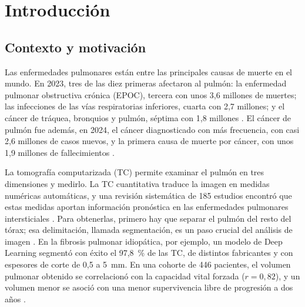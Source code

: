 %

\section{Introducción}\label{sec:introduction}

\subsection{Contexto y motivación}\label{sec:context}
Las enfermedades pulmonares están entre las principales causas de muerte en el
mundo. En 2023, tres de las diez primeras afectaron al pulmón: la enfermedad
pulmonar obstructiva crónica (EPOC), tercera con unos 3,6 millones de muertes;
las infecciones de las vías respiratorias inferiores, cuarta con 2,7 millones;
y el cáncer de tráquea, bronquios y pulmón, séptima con 1,8 millones
\parencite{oms2026}. El cáncer de pulmón fue además, en 2024, el cáncer
diagnosticado con más frecuencia, con casi 2,6 millones de casos nuevos, y la
primera causa de muerte por cáncer, con unos 1,9 millones de fallecimientos
\parencite{sung2026}.

La tomografía computarizada (TC) permite examinar el pulmón en tres
dimensiones y medirlo. La TC cuantitativa traduce la imagen en medidas
numéricas automáticas, y una revisión sistemática de 185 estudios encontró que
estas medidas aportan información pronóstica en las enfermedades pulmonares
intersticiales \parencite{dixon2025}. Para obtenerlas, primero hay que separar
el pulmón del resto del tórax; esa delimitación, llamada segmentación, es un
paso crucial del análisis de imagen \parencite{hofmanninger2020}. En la
fibrosis pulmonar idiopática, por ejemplo, un modelo de Deep Learning segmentó
con éxito el 97,8~\% de las TC, de distintos fabricantes y con espesores de
corte de 0,5 a 5~mm. En una cohorte de 446 pacientes, el volumen pulmonar
obtenido se correlacionó con la capacidad vital forzada ($r = 0{,}82$), y un
volumen menor se asoció con una menor supervivencia libre de progresión a dos
años \parencite{thillai2024}.

